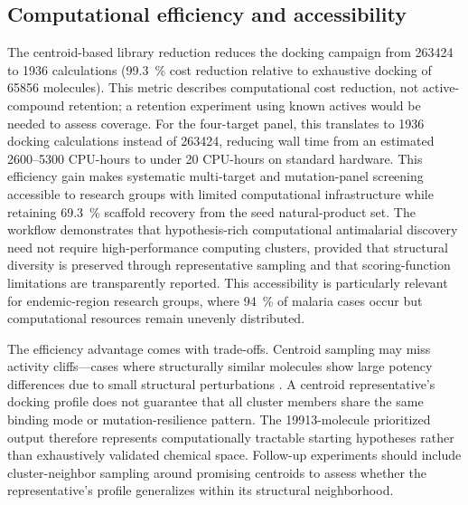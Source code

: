 \documentclass[journal=jcisd8,manuscript=article]{achemso}
\begin{document}
\subsection{Computational efficiency and accessibility}\label{sec:disc_efficiency}
The centroid-based library reduction reduces the docking campaign from \num{263424} to \num{1936} calculations (\qty{99.3}{\percent} cost reduction relative to exhaustive docking of \num{65856} molecules). This metric describes computational cost reduction, not active-compound retention; a retention experiment using known actives would be needed to assess coverage. For the four-target panel, this translates to \num{1936} docking calculations instead of \num{263424}, reducing wall time from an estimated \numrange{2600}{5300} CPU-hours to under \num{20} CPU-hours on standard hardware. This efficiency gain makes systematic multi-target and mutation-panel screening accessible to research groups with limited computational infrastructure while retaining \qty{69.3}{\percent} scaffold recovery from the seed natural-product set. The workflow demonstrates that hypothesis-rich computational antimalarial discovery need not require high-performance computing clusters, provided that structural diversity is preserved through representative sampling and that scoring-function limitations are transparently reported. This accessibility is particularly relevant for endemic-region research groups, where \qty{94}{\percent} of malaria cases occur \cite{WHO2024MalariaReport} but computational resources remain unevenly distributed.

The efficiency advantage comes with trade-offs. Centroid sampling may miss activity cliffs—cases where structurally similar molecules show large potency differences due to small structural perturbations \cite{Stumpfe2012}. A centroid representative's docking profile does not guarantee that all cluster members share the same binding mode or mutation-resilience pattern. The \num{19913}-molecule prioritized output therefore represents computationally tractable starting hypotheses rather than exhaustively validated chemical space. Follow-up experiments should include cluster-neighbor sampling around promising centroids to assess whether the representative's profile generalizes within its structural neighborhood.
\end{document}
